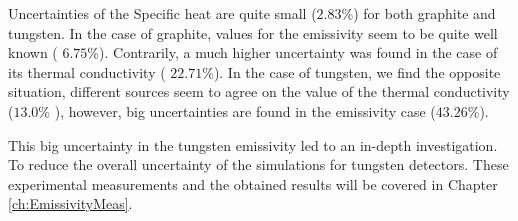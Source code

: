 Uncertainties of the Specific heat are quite small ($2.83 \% $) for both graphite and tungsten. In the case of graphite, values for the emissivity seem to be quite well known ( $ 6.75\%$). Contrarily, a much higher uncertainty was found in the case of its thermal conductivity ( $ 22.71\%$). In the case of tungsten, we find the opposite situation, different sources seem to agree on the value of the thermal conductivity ($13.0\%$ ), however, big uncertainties are found in the emissivity case ($43.26 \%$). 

This big uncertainty in the tungsten emissivity led to an in-depth investigation. To reduce the overall uncertainty of the simulations for tungsten detectors. These experimental measurements and the obtained results will be covered in Chapter \ref{ch:EmissivityMeas}.
